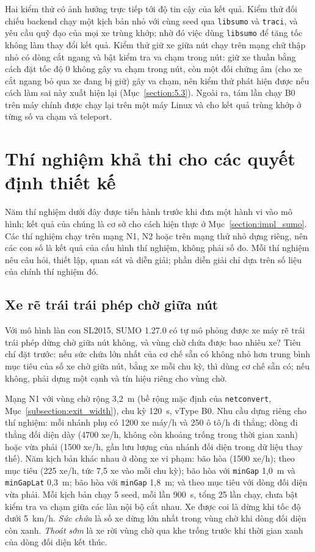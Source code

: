 \documentclass[../main.tex]{subfiles}
\begin{document}
Hai kiểm thử có ảnh hưởng trực tiếp tới độ tin cậy của kết quả. Kiểm thử đối chiếu backend chạy một kịch bản nhỏ với cùng seed qua \texttt{libsumo} và \texttt{traci}, và yêu cầu quỹ đạo của mọi xe trùng khớp; nhờ đó việc dùng \texttt{libsumo} để tăng tốc không làm thay đổi kết quả. Kiểm thử giữ xe giữa nút chạy trên mạng chữ thập nhỏ có dòng cắt ngang và bật kiểm tra va chạm trong nút: giữ xe thuần bằng cách đặt tốc độ 0 không gây va chạm trong nút, còn một đối chứng âm (cho xe cắt ngang bỏ qua xe đang bị giữ) gây va chạm, nên kiểm thử phát hiện được nếu cách làm sai này xuất hiện lại (Mục~\ref{section:5.3}). Ngoài ra, tám lần chạy B0 trên máy chính được chạy lại trên một máy Linux và cho kết quả trùng khớp ở từng số va chạm và teleport.

\section{Thí nghiệm khả thi cho các quyết định thiết kế}
\label{section:feasibility}

Năm thí nghiệm dưới đây được tiến hành trước khi đưa một hành vi vào mô hình; kết quả của chúng là cơ sở cho cách hiện thực ở Mục~\ref{section:impl_sumo}. Các thí nghiệm chạy trên mạng N1, N2 hoặc trên mạng thử nhỏ dựng riêng, nên các con số là kết quả của cấu hình thí nghiệm, không phải số đo. Mỗi thí nghiệm nêu câu hỏi, thiết lập, quan sát và diễn giải; phần diễn giải chỉ dựa trên số liệu của chính thí nghiệm đó.

\subsection{Xe rẽ trái trái phép chờ giữa nút}
\label{section:box_capacity}

Với mô hình làn con SL2015, SUMO 1.27.0 có tự mô phỏng được xe máy rẽ trái trái phép dừng chờ giữa nút không, và vùng chờ chứa được bao nhiêu xe? Tiêu chí đặt trước: nếu sức chứa lớn nhất của cơ chế sẵn có không nhỏ hơn trung bình mục tiêu của số xe chờ giữa nút, bằng  xe mỗi chu kỳ, thì dùng cơ chế sẵn có; nếu không, phải dựng một cạnh và tín hiệu riêng cho vùng chờ.

Mạng N1 với vùng chờ rộng 3,2~m (bề rộng mặc định của \texttt{netconvert}, Mục~\ref{subsection:exit_width}), chu kỳ 120~s, vType B0. Nhu cầu dựng riêng cho thí nghiệm: mỗi nhánh phụ có 1200 xe máy/h và 250 ô tô/h đi thẳng; dòng đi thẳng đối diện dày (4700 xe/h, không còn khoảng trống trong thời gian xanh) hoặc vừa phải (1500 xe/h, gần lưu lượng của nhánh đối diện trong dữ liệu thay thế). Năm kịch bản khác nhau ở dòng xe vi phạm: bão hòa (1500 xe/h); theo mục tiêu (225 xe/h, tức 7,5 xe vào mỗi chu kỳ); bão hòa với \texttt{minGap} 1,0~m và \texttt{minGapLat} 0,3~m; bão hòa với \texttt{minGap} 1,8~m; và theo mục tiêu với dòng đối diện vừa phải. Mỗi kịch bản chạy 5 seed, mỗi lần 900~s, tổng 25 lần chạy, chưa bật kiểm tra va chạm giữa các làn nội bộ cắt nhau. Xe được coi là dừng khi tốc độ dưới 5~km/h. \emph{Sức chứa} là số xe dừng lớn nhất trong vùng chờ khi dòng đối diện còn xanh. \emph{Thoát sớm} là xe rời vùng chờ qua khe trống trước khi thời gian xanh của dòng đối diện kết thúc.
\end{document}
